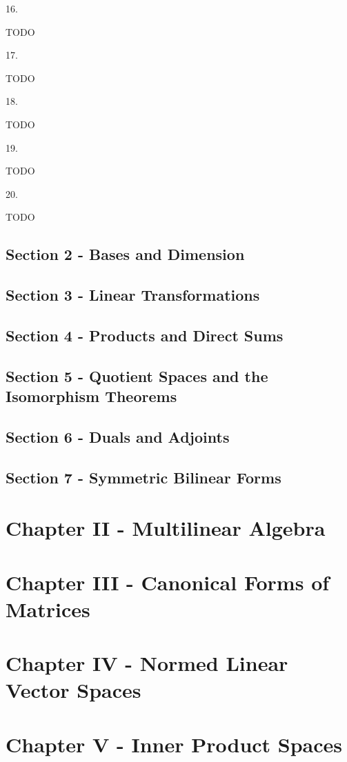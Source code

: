 \documentclass[letterpaper,11pt]{article}
\theoremstyle{definition}
\begin{document}
\begin{flushleft}
	16.
\end{flushleft}
TODO
\hrulefill

\begin{flushleft}
	17.
\end{flushleft}
TODO
\hrulefill

\begin{flushleft}
	18.
\end{flushleft}
TODO
\hrulefill

\begin{flushleft}
	19.
\end{flushleft}
TODO
\hrulefill

\begin{flushleft}
	20.
\end{flushleft}
TODO


\subsection*{Section 2 - Bases and Dimension}
\subsection*{Section 3 - Linear Transformations}
\subsection*{Section 4 - Products and Direct Sums}
\subsection*{Section 5 - Quotient Spaces and the Isomorphism Theorems}
\subsection*{Section 6 - Duals and Adjoints}
\subsection*{Section 7 - Symmetric Bilinear Forms}



\pagebreak
\section*{Chapter II - Multilinear Algebra}

\pagebreak
\section*{Chapter III - Canonical Forms of Matrices}

\pagebreak
\section*{Chapter IV - Normed Linear Vector Spaces}

\pagebreak
\section*{Chapter V - Inner Product Spaces}
\end{document}
